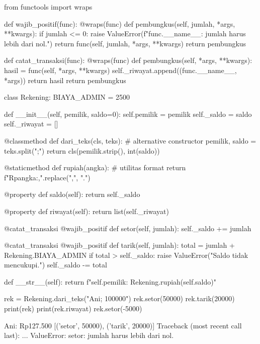\begin{kode}[rekening.py]
from functools import wraps

def wajib_positif(func):
    @wraps(func)
    def pembungkus(self, jumlah, *args, **kwargs):
        if jumlah <= 0:
            raise ValueError(f"{func.__name__}: jumlah harus lebih dari nol.")
        return func(self, jumlah, *args, **kwargs)
    return pembungkus

def catat_transaksi(func):
    @wraps(func)
    def pembungkus(self, *args, **kwargs):
        hasil = func(self, *args, **kwargs)
        self._riwayat.append((func.__name__, *args))
        return hasil
    return pembungkus


class Rekening:
    BIAYA_ADMIN = 2500

    def __init__(self, pemilik, saldo=0):
        self.pemilik = pemilik
        self._saldo = saldo
        self._riwayat = []

    @classmethod
    def dari_teks(cls, teks):                 # alternative constructor
        pemilik, saldo = teks.split(";")
        return cls(pemilik.strip(), int(saldo))

    @staticmethod
    def rupiah(angka):                        # utilitas format
        return f"Rp{angka:,}".replace(",", ".")

    @property
    def saldo(self):
        return self._saldo

    @property
    def riwayat(self):
        return list(self._riwayat)

    @catat_transaksi
    @wajib_positif
    def setor(self, jumlah):
        self._saldo += jumlah

    @catat_transaksi
    @wajib_positif
    def tarik(self, jumlah):
        total = jumlah + Rekening.BIAYA_ADMIN
        if total > self._saldo:
            raise ValueError("Saldo tidak mencukupi.")
        self._saldo -= total

    def __str__(self):
        return f"{self.pemilik}: {Rekening.rupiah(self.saldo)}"


rek = Rekening.dari_teks("Ani; 100000")
rek.setor(50000)
rek.tarik(20000)
print(rek)
print(rek.riwayat)
rek.setor(-5000)
\end{kode}

\begin{keluaran}
Ani: Rp127.500
[('setor', 50000), ('tarik', 20000)]
Traceback (most recent call last):
  ...
ValueError: setor: jumlah harus lebih dari nol.
\end{keluaran}

